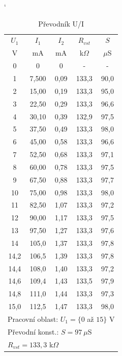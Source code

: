 \documentclass[a4paper, czech]{article}
\begin{document}
\begin{minipage}{0.48\textwidth}
    \begin{table}[H]
        \catcode`
        \centering
        \caption{Převodník U/I}
        \begin{tabular}{ccccc}
            \toprule
            $U_1$  & $I_1$  & $I_2$    & $R_{vst}$  & $S$     \\
            \cmidrule(rl){1-1}
            \cmidrule(rl){2-2}
            \cmidrule(rl){3-3}
            \cmidrule(rl){4-4}
            \cmidrule(rl){5-5}
            V    & mA    & mA   & k$\Omega$    & $\mu$S         \\
            \midrule
            0    & 0     & 0    & -     & -         \\
            1    & 7,500 & 0,09 & 133,3 & 90,0 \\
            2    & 15,00 & 0,19 & 133,3 & 95,0 \\
            3    & 22,50 & 0,29 & 133,3 & 96,6 \\
            4    & 30,10 & 0,39 & 132,9 & 97,5 \\
            5    & 37,50 & 0,49 & 133,3 & 98,0 \\
            6    & 45,00 & 0,58 & 133,3 & 96,6 \\
            7    & 52,50 & 0,68 & 133,3 & 97,1 \\
            8    & 60,00 & 0,78 & 133,3 & 97,5 \\
            9    & 67,50 & 0,88 & 133,3 & 97,7 \\
            10   & 75,00 & 0,98 & 133,3 & 98,0 \\
            11   & 82,50 & 1,07 & 133,3 & 97,2 \\
            12   & 90,00 & 1,17 & 133,3 & 97,5 \\
            13   & 97,50 & 1,27 & 133,3 & 97,6 \\
            14   & 105,0 & 1,37 & 133,3 & 97,8 \\
            14,2 & 106,5 & 1,39 & 133,3 & 97,8 \\
            14,4 & 108,0 & 1,40 & 133,3 & 97,2 \\
            14,6 & 109,4 & 1,43 & 133,5 & 97,9 \\
            14,8 & 111,0 & 1,44 & 133,3 & 97,3 \\
            15,0 & 112,5 & 1,47 & 133,3 & 98,0 \\
            \bottomrule
            \multicolumn{5}{l}{Pracovní oblast: $U_1 = \{0$ až $15\}$ V} \\
            \multicolumn{5}{l}{Převodní konst.: $S = 97\ \mu$S} \\
            \multicolumn{5}{l}{$R_{vst} = 133,3$ k$\Omega$} \\
        \end{tabular}
    \end{table}
\end{minipage}
\end{document}
